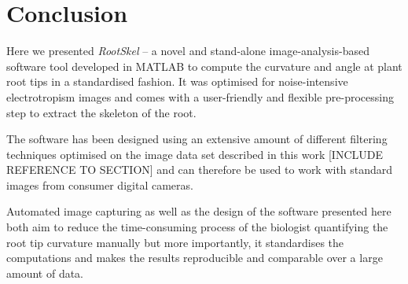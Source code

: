 
\chapter{Conclusion} %

\label{conclusion} %

%







Here we presented \textit{RootSkel} -- a novel and stand-alone image-analysis-based software tool developed in MATLAB to compute the curvature and angle at plant root tips in a standardised fashion. It was optimised for noise-intensive electrotropism images and comes with a user-friendly and flexible pre-processing step to extract the skeleton of the root. %

The software has been designed using an extensive amount of different filtering techniques optimised on the image data set described in this work [INCLUDE REFERENCE TO SECTION] and can therefore be used to work with standard images from consumer digital cameras. 

Automated image capturing as well as the design of the software presented here both aim to reduce the time-consuming process of the biologist quantifying the root tip curvature manually but more importantly, it standardises the computations and makes the results reproducible and comparable over a large amount of data. 

